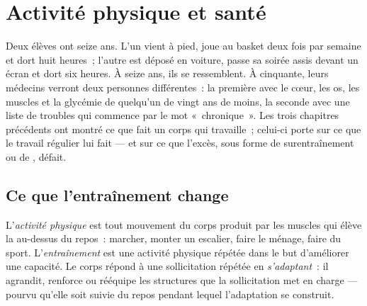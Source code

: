 \chapter{Activité physique et santé}\label{ch:g10:sport-and-health}

Deux élèves ont seize ans. L'un vient à pied, joue au basket deux fois
par semaine et dort huit heures~; l'autre est déposé en voiture, passe
sa soirée assis devant un écran et dort six heures. À seize ans, ils se
ressemblent. À cinquante, leurs médecins verront deux personnes
différentes~: la première avec le cœur, les os, les muscles et la
glycémie de quelqu'un de vingt ans de moins, la seconde avec une liste
de troubles qui commence par le mot «~chronique~». Les trois chapitres
précédents ont montré ce que fait un corps qui travaille~; celui-ci
porte sur ce que le travail régulier lui fait --- et sur ce que
l'excès, sous forme de surentraînement ou de , défait.

\section{Ce que l'entraînement change}

\begin{definition}\label{def:g10:sport-and-health:training}
L'\emph{activité physique} est tout mouvement
du corps produit par les muscles qui élève la 
au-dessus du repos~: marcher, monter un escalier, faire le ménage,
faire du sport. L'\emph{entraînement} est une activité physique répétée
dans le but d'améliorer une capacité. Le corps répond à une sollicitation
répétée en \emph{s'adaptant}~: il agrandit, renforce ou rééquipe les
structures que la sollicitation met en charge --- pourvu qu'elle soit
suivie du repos pendant lequel l'adaptation se construit.
\end{definition}

